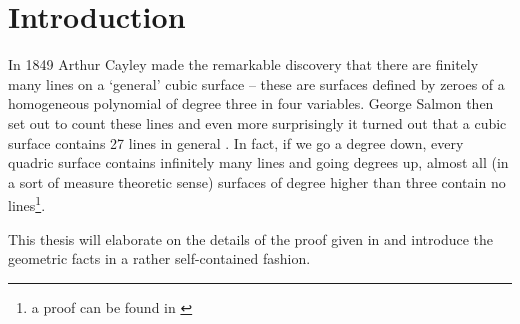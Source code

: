 \section{Introduction}

In 1849 Arthur Cayley made the remarkable discovery that there are finitely many lines on a `general' cubic surface -- these are surfaces defined by zeroes of a homogeneous polynomial of degree three in four variables.
George Salmon then set out to count these lines and even more surprisingly it turned out that a cubic surface contains 27 lines in general \cite[p. 496]{salmon1882treatise}.
In fact, if we go a degree down, every quadric surface contains infinitely many lines and going degrees up, almost all (in a sort of measure theoretic sense) surfaces of degree higher than three contain no lines\footnote{a proof can be found in \cite[theorem 1.27]{shafarevich1994basic}}.

This thesis will elaborate on the details of the proof given in \cite[§7]{reid1988undergraduate} and introduce the geometric facts in a rather self-contained fashion.
